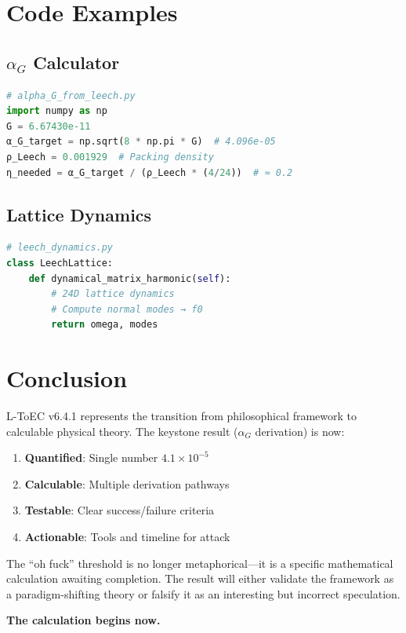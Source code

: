 \documentclass[11pt]{article}
\begin{document}
\section{Code Examples}

\subsection{$\alpha_G$ Calculator}
\begin{lstlisting}[language=Python]
# alpha_G_from_leech.py
import numpy as np
G = 6.67430e-11
α_G_target = np.sqrt(8 * np.pi * G)  # 4.096e-05
ρ_Leech = 0.001929  # Packing density
η_needed = α_G_target / (ρ_Leech * (4/24))  # ≈ 0.2
\end{lstlisting}

\subsection{Lattice Dynamics}
\begin{lstlisting}[language=Python]
# leech_dynamics.py
class LeechLattice:
    def dynamical_matrix_harmonic(self):
        # 24D lattice dynamics
        # Compute normal modes → f0
        return omega, modes
\end{lstlisting}

\section{Conclusion}

L-ToEC v6.4.1 represents the transition from philosophical framework to calculable physical theory. The keystone result ($\alpha_G$ derivation) is now:

\begin{enumerate}
\item \textbf{Quantified}: Single number $4.1\times 10^{-5}$
\item \textbf{Calculable}: Multiple derivation pathways
\item \textbf{Testable}: Clear success/failure criteria  
\item \textbf{Actionable}: Tools and timeline for attack
\end{enumerate}

The ``oh fuck'' threshold is no longer metaphorical—it is a specific mathematical calculation awaiting completion. The result will either validate the framework as a paradigm-shifting theory or falsify it as an interesting but incorrect speculation.

\textbf{The calculation begins now.}
\end{document}
